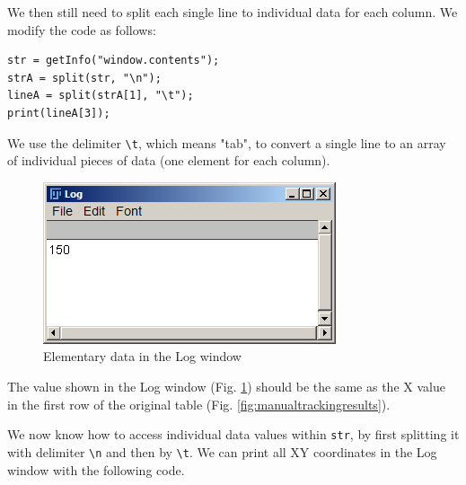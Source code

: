 \documentclass[11pt,a4paper,oneside]{report}
\newcommand{\ilcom}[1]{\texttt{\small#1}}
\begin{document}
We then still need to split each single line to individual data for each column. We modify the code as follows:
\begin{lstlisting}[numbers=none, morekeywords={*, split}]
str = getInfo("window.contents");
strA = split(str, "\n");
lineA = split(strA[1], "\t");
print(lineA[3]);
\end{lstlisting}

We use the delimiter \ilcom{\textbackslash{}t}, which means "tab", to convert a single line to an array of individual pieces of data (one element for each column). 
\begin{figure}[htbp]
\begin{center}
\includegraphics[scale=0.6]{fig/fig253_XfirstlineValue.png}
\caption{Elementary data in the Log window}
\label{fig:doublesplittedLine}
\end{center}
\end{figure}

The value shown in the Log window (Fig. \ref{fig:doublesplittedLine}) 
should be the same as the X value in the first row of the original table (Fig. \ref{fig:manualtrackingresults}). 

We now know how to access individual data values within \ilcom{str}, 
by first splitting it with delimiter \ilcom{\textbackslash{}n} and then by
\ilcom{\textbackslash{}t}. We can print all XY coordinates in the Log window with the following code.  


\end{document}
